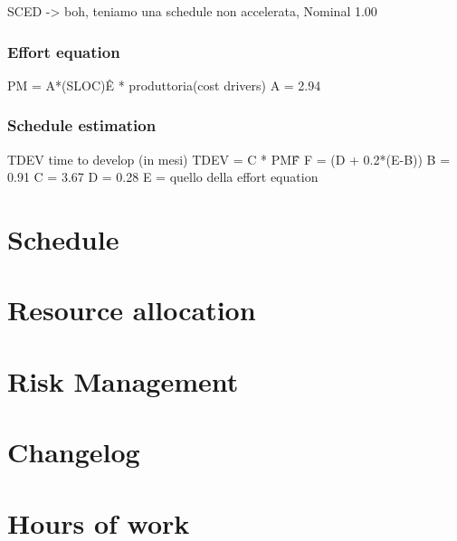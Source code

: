 \documentclass[english]{article}
\begin{document}
SCED -> boh, teniamo una schedule non accelerata, Nominal 1.00

\subsubsection{Effort equation}


PM = A*(SLOC)\^E * produttoria(cost drivers)
A = 2.94



\subsubsection{Schedule estimation}

TDEV time to develop (in mesi)
TDEV = C * PM\^F
F = (D + 0.2*(E-B))
B = 0.91
C = 3.67
D = 0.28
E = quello della effort equation


\section{Schedule}


\section{Resource allocation}


\section{Risk Management}

\appendix

\section{Changelog}

\section{Hours of work}
\end{document}
